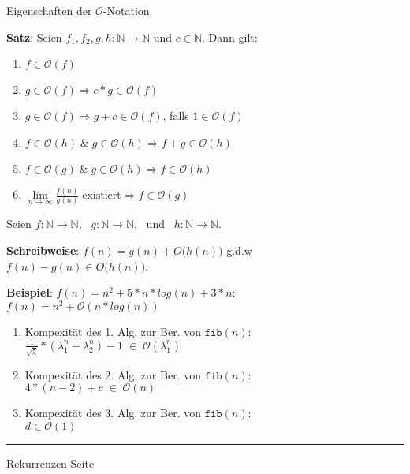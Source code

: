 \documentclass{slides}
\newcounter{mypage}
\newcommand{\bruch}[2]{\frac{\displaystyle#1}{\displaystyle#2}}
\newcommand{\Oh}{\mathcal{O}}
\begin{document}
\begin{slide}{}
\normalsize

\begin{center}
Eigenschaften der $\Oh$-Notation
\end{center}
\vspace*{0.5cm}

\footnotesize
\textbf{Satz}: Seien $f_1,f_2,g,h: \mathbb{N} \rightarrow \mathbb{N}$ und $c \in \mathbb{N}$. Dann gilt:
\begin{enumerate}
\item $f \in \Oh(f)$
\item $g \in \Oh(f) \Rightarrow c * g \in \Oh(f)$
\item $g \in \Oh(f) \Rightarrow g + c \in \Oh(f)$, falls $1 \in \Oh(f)$
\item $f \in \Oh(h) \;\&\; g \in \Oh(h) \Rightarrow f + g \in \Oh(h)$
\item $f \in \Oh(g) \;\&\; g \in \Oh(h) \Rightarrow f \in \Oh(h)$
\item $\lim\limits_{n \rightarrow \infty} \bruch{f(n)}{g(n)}\; \mbox{existiert}
       \Rightarrow f \in \Oh(g)$
  
\end{enumerate}

Seien $f:\mathbb{N} \rightarrow  \mathbb{N}$, \ $g:\mathbb{N} \rightarrow  \mathbb{N}$, \ und \ $h:\mathbb{N} \rightarrow  \mathbb{N}$.

\textbf{Schreibweise}: $f(n) = g(n) + O\bigg(h(n)\bigg)$ g.d.w \\[0.3cm]
\hspace*{1.3cm} $f(n) - g(n) \in O\bigg(h(n)\bigg)$.

\textbf{Beispiel}: $f(n) = n^2 + 5 * n*log(n) + 3*n$: \\[0.3cm]
\hspace*{1.3cm}   $f(n) = n^2 + \Oh(n*log(n))$ 


\begin{enumerate}
\item Kompexit\"at des 1. Alg. zur Ber. von $\mathtt{fib}(n)$: \\[0.3cm]
      \hspace*{1.3cm} 
      $\bruch{1}{\sqrt{5}} * (\lambda_1^n - \lambda_2^n) - 1 \;\in\;\Oh(\lambda_1^n)$
\item Kompexit\"at des 2. Alg. zur Ber. von $\mathtt{fib}(n)$: \\[0.3cm]
      \hspace*{1.3cm} $4 * (n - 2) + c \;\in\; \Oh(n)$
\item Kompexit\"at des 3. Alg. zur Ber. von $\mathtt{fib}(n)$: \\[0.3cm]
      \hspace*{1.3cm} $d \in \Oh(1)$
\end{enumerate}

\vspace*{\fill}
\tiny \addtocounter{mypage}{1}
\rule{17cm}{1mm}
Rekurrenzen  \hspace*{\fill} Seite 
\end{slide}
\end{document}
